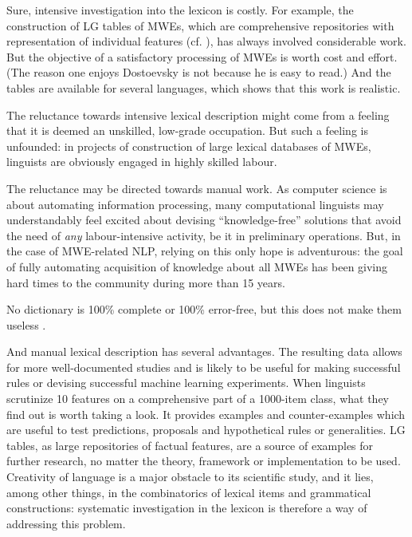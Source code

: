 \documentclass[output=paper]{langsci/langscibook}
\begin{document}
Sure, intensive investigation into the lexicon is costly. For example, the construction of LG tables of MWEs, which are comprehensive repositories with representation of individual features (cf. ), has always involved considerable work. But the objective of a satisfactory processing of MWEs is worth cost and effort. (The reason one enjoys Dostoevsky is not because he is easy to read.) And the tables are available for several languages, which shows that this work is realistic.

The reluctance towards intensive lexical description might come from a feeling that it is deemed an unskilled, low-grade occupation. But such a feeling is unfounded: in projects of construction of large lexical databases of MWEs, linguists are obviously engaged in highly skilled labour.

The reluctance may be directed towards manual work. As computer science is about automating information processing, many computational linguists may understandably feel excited about devising “knowledge-free” solutions that avoid the need of \textit{any} labour-intensive activity, be it in preliminary operations. But, in the case of MWE-related NLP, relying on this only hope is adventurous: the goal of fully automating acquisition of knowledge about all MWEs has been giving hard times to the community during more than 15 years.

No dictionary is 100\% complete or 100\% error-free, but this does not make them useless%
%
%
%
.

And manual lexical description has several advantages. The resulting data allows for more well-documented studies and is likely to be useful for making successful rules or devising successful machine learning experiments. When linguists scrutinize 10 features on a comprehensive part of a 1000-item class, what they find out is worth taking a look. It provides examples and counter-examples which are useful to test predictions, proposals and hypothetical rules or generalities. LG tables, as large repositories of factual features, are a source of examples for further research, no matter the theory, framework or implementation to be used. Creativity of language is a major obstacle to its scientific study, and it lies, among other things, in the combinatorics of lexical items and grammatical constructions: systematic investigation in the lexicon is therefore a way of addressing this problem.
\end{document}
